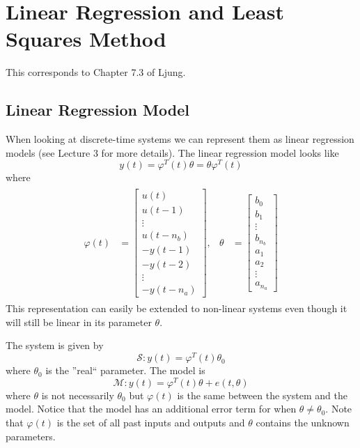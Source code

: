 \section{Linear Regression and Least Squares Method}
This corresponds to Chapter 7.3 of Ljung.

\subsection{Linear Regression Model}
When looking at discrete-time systems we can represent them as linear regression models (see Lecture 3 for more details). The linear regression model looks like
$$y(t) = \varphi^T(t)\theta = \theta\varphi^T(t)$$
where
\begin{align*}
\begin{split}
\varphi(t) &= \left[\begin{array}{c} u(t) \\ u(t-1) \\ \vdots \\ u(t-n_b) \\ -y(t-1) \\ -y(t-2) \\ \vdots \\ -y(t-n_a) \end{array}\right],
\end{split}
\begin{split}
\theta &= \left[\begin{array}{c} b_0 \\ b_1 \\ \vdots \\ b_{n_b} \\ a_1 \\ a_2 \\ \vdots \\ a_{n_a} \end{array}\right]
\end{split}
\end{align*}
This representation can easily be extended to non-linear systems even though it will still be linear in its parameter $\theta$.

The system is given by
$$\mathcal{S}: y(t) = \varphi^T(t)\theta_0$$
where $\theta_0$ is the ''real`` parameter. The model is
$$\mathcal{M}: y(t) = \varphi^T(t)\theta + e(t,\theta)$$
where $\theta$ is not necessarily $\theta_0$ but $\varphi(t)$ is the same between the system and the model. Notice that the model has an additional error term for when $\theta\neq\theta_0$. Note that $\varphi(t)$ is the set of all past inputs and outputs and $\theta$ contains the unknown parameters.

